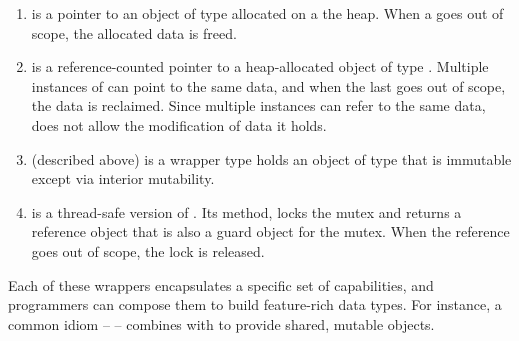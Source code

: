 \begin{enumerate}

\item {} is a pointer to an object of type  allocated on a
  the heap.  When a  goes out of scope, the allocated data is
  freed.
  
\item {} is a reference-counted pointer to a heap-allocated object of type
  .  Multiple instances of
   can point to the same data, and when the last  goes
  out of scope, the data is reclaimed.  Since multiple
   instances can refer to the same data,  does not allow
  the modification of data it holds.

\item {} (described above) is a wrapper type holds an object of type  that
  is immutable except via interior mutability.

\item {} is a thread-safe version of .  Its
   method, locks the mutex and returns a reference object that is
  also a guard object for the mutex.  When the reference goes out of scope, the
  lock is released.
  


  
\end{enumerate}

Each of these wrappers encapsulates a specific set of capabilities, and
programmers can compose them to build feature-rich data types.  For instance, a
common idiom --  -- combines 
with  to provide shared, mutable objects.


